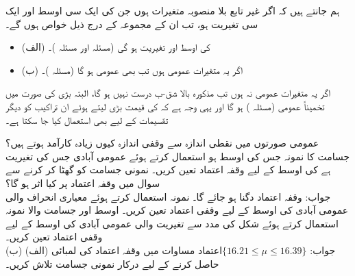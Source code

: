 ہم جانتے ہیں کہ اگر  غیر تابع بلا منصوبہ متغیرات ہوں جن کی ایک سی  اوسط  اور ایک سی  تغیریت  ہو، تب ان کے مجموعہ  کے درج ذیل خواص ہوں گے۔
\begin{itemize}
\item{(الف)}
 کی اوسط  اور تغیریت  ہو گی (مسئلہ  اور  مسئلہ )۔
\item{(ب)}
اگر یہ متغیرات عمومی ہوں تب  بھی عمومی ہو گا (مسئلہ )۔
\end{itemize}

اگر یہ متغیرات عمومی نہ ہوں تب مذکورہ بالا  شق-ب درست نہیں ہو گا، البتہ بڑی  کی صورت میں  تخمیناً عمومی  (مسئلہ ) ہو گا اور یہی وجہ ہے کہ  کی قیمت بڑی لیتے ہوئے  ان تراکیب  کو دیگر تقسیمات کے لیے بھی  استعمال کیا جا سکتا ہے۔

\quad
عمومی صورتوں میں نقطی اندازہ سے وقفی اندازہ کیوں زیادہ کارآمد ہوتے ہیں؟   
\quad
{} جسامت کا نمونہ جس کی اوسط  ہو استعمال کرتے ہوئے  عمومی آبادی جس کی تغیریت  ہے کی اوسط  کے لیے  وقفہ اعتماد تعین کریں۔
\quad
نمونی جسامت کو گھٹا کر  کرنے سے سوال  میں وقفہ اعتماد  پر کیا اثر ہو گا؟\\
جواب:\quad
وقفہ اعتماد دگنا ہو جائے گا۔
\quad
نمونہ  استعمال کرتے ہوئے معیاری انحراف  والی عمومی آبادی کی اوسط کے لیے  وقفی اعتماد تعین کریں۔ 
\quad
اوسط  اور جسامت   والا نمونہ استعمال کرتے ہوئے  شکل  کی مدد سے تغیریت  والی عمومی آبادی کی اوسط کے لیے  وقفی اعتماد تعین کریں۔\\
جواب:\quad
$\text{اعتماد} \{16.21\le \mu\le 16.39\}$
\quad
مساوات  میں  وقفہ اعتماد کی لمبائی (الف)  (ب)  حاصل کرنے  کے لیے درکار نمونی جسامت  تلاش کریں۔

